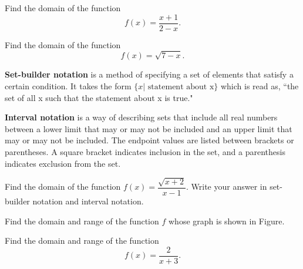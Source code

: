 \begin{example}
  Find the domain of the function $$f(x)=\dfrac{x+1}{2-x}.$$
\end{example}

\begin{example}
  Find the domain of the function
$$
f(x)=\sqrt{7-x}.
$$
\end{example}

\begin{definition}
  \textbf{Set-builder notation} is a method of specifying a set of elements that satisfy a certain condition. It takes the form $\{x|\text{ statement about x}\}$ which is read as, ``the set of all x such that the statement about x is true."
  
  \textbf{Interval notation} is a way of describing sets that include all real numbers between a lower limit that may or may not be included and an upper limit that may or may not be included. The endpoint values are listed between brackets or parentheses. A square bracket indicates inclusion in the set, and a parenthesis indicates exclusion from the set.
\end{definition}

\newpage

\begin{example}
  Find the domain of the function $f(x)=\dfrac{\sqrt{x+2}}{x-1}$. Write your answer in set-builder notation and interval notation.
\end{example}


\begin{example}
  Find the domain and range of the function $f$ whose graph is shown in Figure.


\end{example}
\vspace*{-8\baselineskip}

\begin{example}
  Find the domain and range of the function
  $$f(x)=\frac{2}{x+3}.$$
\end{example}


